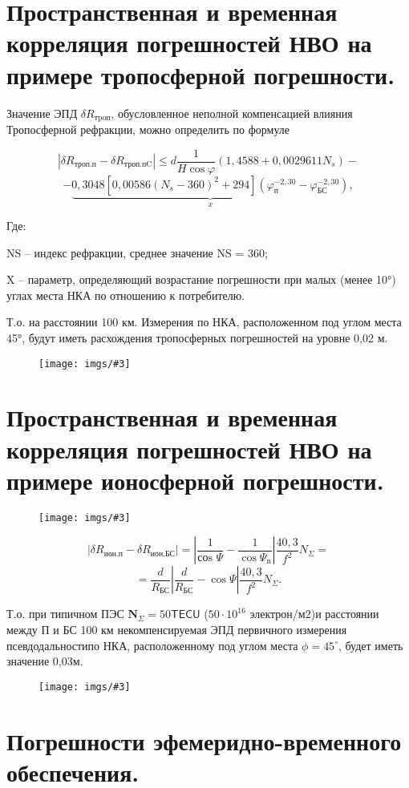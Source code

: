 \documentclass[14pt,a4paper,oneside]{extarticle}
\newcommand{\pic}[3]{
	\begin{figure}[#1]
		\begin{center}
			\texttt{[image: imgs/\#3]}
		\end{center}
	\end{figure}
}
\begin{document}
\section{Пространственная и временная корреляция погрешностей НВО на примере тропосферной погрешности.}

Значение ЭПД $\delta R_{\text{тpoп}}$, обусловленное неполной компенсацией  влияния Тропосферной рефракции, можно определить по формуле

\[|\delta R_{\text{троп.п}}-\delta R_{\text{троп.пC}}|\leqslant d\frac{1}{H\cos\varphi}(1,4588+0,0029611N_{s})-\]
\[-\underbrace{0,3048[0,00586(N_s-360)^2+294](\varphi_\text{п}^{-2,30}-\varphi_\text{БС}^{-2,30})}_{x},\]

Где:

NS – индекс рефракции, среднее значение NS = 360; 

X – параметр, определяющий возрастание погрешности при малых (менее 10°) углах места НКА по отношению к потребителю.

Т.о. на расстоянии 100 км. Измерения по НКА, расположенном под углом места 45°, будут иметь расхождения тропосферных погрешностей на уровне 0,02 м.

\pic{H}{\textwidth/2}{3}

\section{Пространственная и временная корреляция погрешностей НВО на примере ионосферной погрешности.}

\pic{H}{\textwidth}{4}

\[\left|\delta R_{\text{ион.п}}-\delta R_{\text{ион.БС}}\right|=\left|\frac{1}{\text{соs }\Psi}-\frac{1}{\cos\Psi_{\text{n}}}\right|\frac{40,3}{f^{2}}N_{\Sigma}=\]
\[=\frac{d}{R_{\text{БС}}}\left|\frac{d}{R_{\text{БС}}}-\cos\Psi\right|\frac{40,3}{f^{2}}N_{\Sigma}.\]

Т.о. при типичном ПЭС $\mathbf{N}_{\Sigma}=50\mathsf{ TECU}$ ($50\cdot10^{16}$ электрон/м2)и расстоянии между П и БС 100 км некомпенсируемая ЭПД первичного измерения псевдодальностипо НКА, расположенному под углом места $\phi=45^{\circ}$, будет иметь значение 0,03м.

\pic{H}{\textwidth}{5}

\section{Погрешности эфемеридно-временного обеспечения.}
\end{document}
